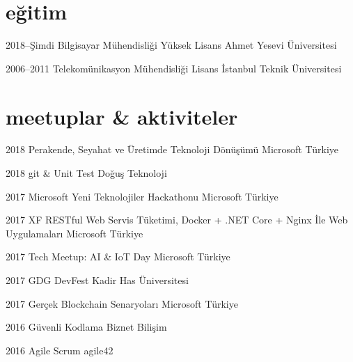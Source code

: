 \documentclass[]{../friggeri-cv} %
\begin{document}
\section{eğitim}

\begin{entrylist}

\entry
{2018--Şimdi}
{Bilgisayar Mühendisliği}
{Yüksek Lisans}
{Ahmet Yesevi Üniversitesi}

\entry
{2006--2011}
{Telekomünikasyon Mühendisliği}
{Lisans}
{İstanbul Teknik Üniversitesi}
	
\end{entrylist}

\section{meetuplar \& aktiviteler}

\begin{entrylist}

\entry
{2018}
{Perakende, Seyahat ve Üretimde Teknoloji Dönüşümü}
{}
{Microsoft Türkiye}

\entry
{2018}
{git \& Unit Test}
{}
{Doğuş Teknoloji}

\entry
{2017}
{Microsoft Yeni Teknolojiler Hackathonu}
{}
{Microsoft Türkiye}

\entry
{2017}
{XF RESTful Web Servis Tüketimi, Docker + .NET Core + Nginx İle Web Uygulamaları}
{}
{Microsoft Türkiye}

\entry
{2017}
{Tech Meetup: AI \& IoT Day}
{}
{Microsoft Türkiye}

\entry
{2017}
{GDG DevFest}
{}
{Kadir Has Üniversitesi}

\entry
{2017}
{Gerçek Blockchain Senaryoları}
{}
{Microsoft Türkiye}

\entry
{2016}
{Güvenli Kodlama}
{}
{Biznet Bilişim}

\entry
{2016}
{Agile Scrum}
{}
{agile42}

\end{entrylist}
\end{document}
